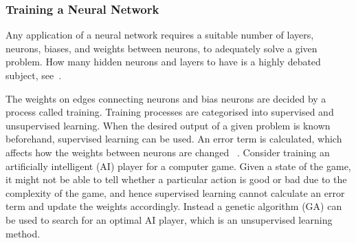 \subsubsection{Training a Neural Network}
Any application of a neural network requires a suitable number of layers, neurons, biases, and weights between neurons, to adequately solve a given problem. How many hidden neurons and layers to have is a highly debated subject, see~\cite{sarle1997}.

The weights on edges connecting neurons and bias neurons are decided by a process called training. Training processes are categorised into supervised and unsupervised learning. When the desired output of a given problem is known beforehand, supervised learning can be used. An error term is calculated, which affects how the weights between neurons are changed ~\cite{backpropagation}. Consider training an artificially intelligent (AI) player for a computer game. Given a state of the game, it might not be able to tell whether a particular action is good or bad due to the complexity of the game, and hence supervised learning cannot calculate an error term and update the weights accordingly. Instead a genetic algorithm (GA) can be used to search for an optimal AI player, which is an unsupervised learning method.


